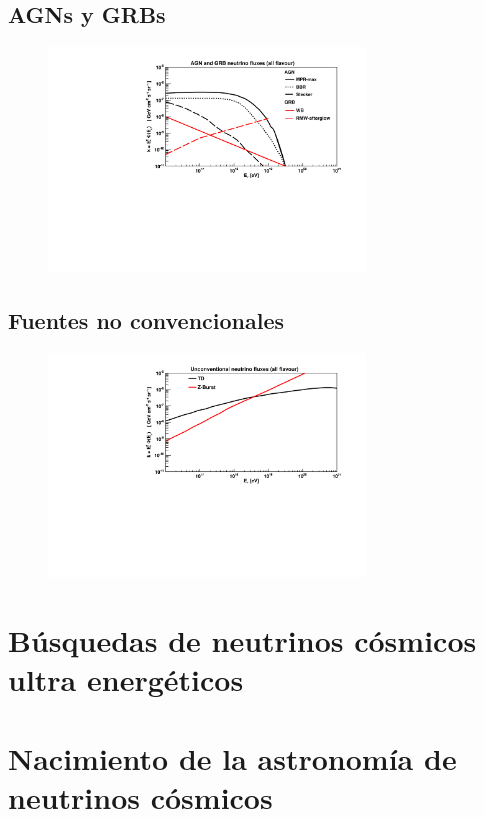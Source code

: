 	\subsection{AGNs y GRBs}
	
	\begin{figure}[ht]
		\begin{center}
		\includegraphics[width=0.75\textwidth]{fig/introduccion/AGN_GRB_nufluxes}
		\caption{\label{fig:flujosAGN} }
		\end{center}
	\end{figure}
	
	\subsection{Fuentes no convencionales}
	
	\begin{figure}[ht]
		\begin{center}
		\includegraphics[width=0.75\textwidth]{fig/introduccion/unconventional_nuFluxes}
		\caption{\label{fig:flujosNoConv} }
		\end{center}
	\end{figure}

\section{Búsquedas de neutrinos cósmicos ultra energéticos}

\section{Nacimiento de la astronom\'ia de neutrinos c\'osmicos}


